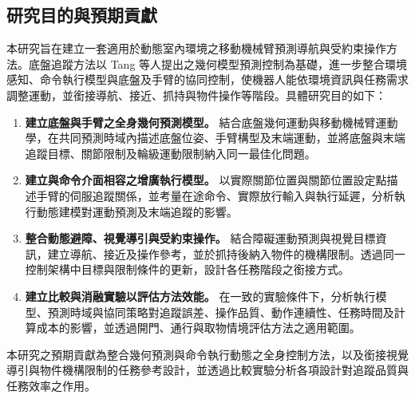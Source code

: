 \subsection{研究目的與預期貢獻}
\label{subsec:objectives_contributions}

本研究旨在建立一套適用於動態室內環境之移動機械臂預測導航與受約束操作方法。底盤追蹤方法以 Tang 等人\cite{tang2024gmpc}提出之幾何模型預測控制為基礎，進一步整合環境感知、命令執行模型與底盤及手臂的協同控制，使機器人能依環境資訊與任務需求調整運動，並銜接導航、接近、抓持與物件操作等階段。具體研究目的如下：

\begin{enumerate}
    \item \textbf{建立底盤與手臂之全身幾何預測模型。}
    結合底盤幾何運動與移動機械臂運動學，在共同預測時域內描述底盤位姿、手臂構型及末端運動，並將底盤與末端追蹤目標、關節限制及輪級運動限制納入同一最佳化問題。

    \item \textbf{建立與命令介面相容之增廣執行模型。}
    以實際關節位置與關節位置設定點描述手臂的伺服追蹤關係，並考量在途命令、實際放行輸入與執行延遲，分析執行動態建模對運動預測及末端追蹤的影響。

    \item \textbf{整合動態避障、視覺導引與受約束操作。}
    結合障礙運動預測與視覺目標資訊，建立導航、接近及操作參考，並於抓持後納入物件的機構限制。透過同一控制架構中目標與限制條件的更新，設計各任務階段之銜接方式。

    \item \textbf{建立比較與消融實驗以評估方法效能。}
    在一致的實驗條件下，分析執行模型、預測時域與協同策略對追蹤誤差、操作品質、動作連續性、任務時間及計算成本的影響，並透過開門、通行與取物情境評估方法之適用範圍。
\end{enumerate}

本研究之預期貢獻為整合幾何預測與命令執行動態之全身控制方法，以及銜接視覺導引與物件機構限制的任務參考設計，並透過比較實驗分析各項設計對追蹤品質與任務效率之作用。

